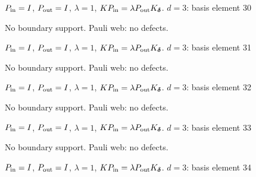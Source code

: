 $P_{\rm in}=I$, \quad $P_{\rm out}=I$, \quad $\lambda=1$, \qquad $K P_{\rm in}=\lambda P_{\rm out}K_{\boldsymbol\delta}$.
\vfill
{\footnotesize\texttt{}}
\newpage
{}
{\Large $d=3$: basis element 30}\par
No boundary support. Pauli web: no defects.
\begin{center}
\end{center}
\vspace{-1mm}
$P_{\rm in}=I$, \quad $P_{\rm out}=I$, \quad $\lambda=1$, \qquad $K P_{\rm in}=\lambda P_{\rm out}K_{\boldsymbol\delta}$.
\vfill
{\footnotesize\texttt{}}
\newpage
{}
{\Large $d=3$: basis element 31}\par
No boundary support. Pauli web: no defects.
\begin{center}
\end{center}
\vspace{-1mm}
$P_{\rm in}=I$, \quad $P_{\rm out}=I$, \quad $\lambda=1$, \qquad $K P_{\rm in}=\lambda P_{\rm out}K_{\boldsymbol\delta}$.
\vfill
{\footnotesize\texttt{}}
\newpage
{}
{\Large $d=3$: basis element 32}\par
No boundary support. Pauli web: no defects.
\begin{center}
\end{center}
\vspace{-1mm}
$P_{\rm in}=I$, \quad $P_{\rm out}=I$, \quad $\lambda=1$, \qquad $K P_{\rm in}=\lambda P_{\rm out}K_{\boldsymbol\delta}$.
\vfill
{\footnotesize\texttt{}}
\newpage
{}
{\Large $d=3$: basis element 33}\par
No boundary support. Pauli web: no defects.
\begin{center}
\end{center}
\vspace{-1mm}
$P_{\rm in}=I$, \quad $P_{\rm out}=I$, \quad $\lambda=1$, \qquad $K P_{\rm in}=\lambda P_{\rm out}K_{\boldsymbol\delta}$.
\vfill
{\footnotesize\texttt{}}
\newpage
{}
{\Large $d=3$: basis element 34}\par
